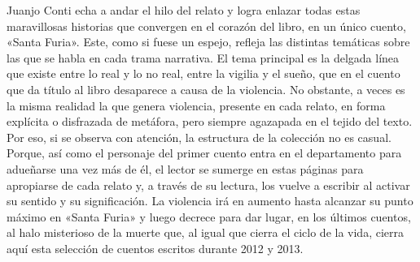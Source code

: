 \documentclass[12pt,twoside,openright,a5paper]{book}
\begin{document}
Juanjo Conti 
echa a andar el hilo del relato y logra enlazar todas estas maravillosas historias que convergen en el corazón del libro, en un único cuento, 
«Santa Furia». Este, como si fuese un espejo, refleja las distintas temáticas sobre las que se habla en cada trama narrativa. El tema principal es la delgada línea que existe entre lo real y lo no real, entre la vigilia y el sueño, que en 
el cuento que da título al libro
desaparece a causa de la violencia. No obstante, a veces es la misma realidad la que genera violencia, 
presente en cada relato, en forma explícita o disfrazada de metáfora, pero siempre agazapada en el tejido del texto. Por eso, si se observa con atención, la estructura de la colección no es casual. Porque, así como el personaje del primer cuento entra en el departamento para adueñarse una vez más de él, el lector se sumerge en estas páginas para apropiarse de cada relato y, a través de su lectura, los vuelve a escribir al activar su sentido y su significación. La violencia irá en aumento hasta alcanzar su punto máximo en «Santa Furia» y luego decrece para dar lugar, en los últimos cuentos, al halo misterioso de la muerte que, al igual que cierra el ciclo de la vida, cierra aquí %
esta selección de cuentos escritos durante 2012 y 2013.



 
 
 
 
 
 
 
 
 
 
 
 
 
 


\end{document}
